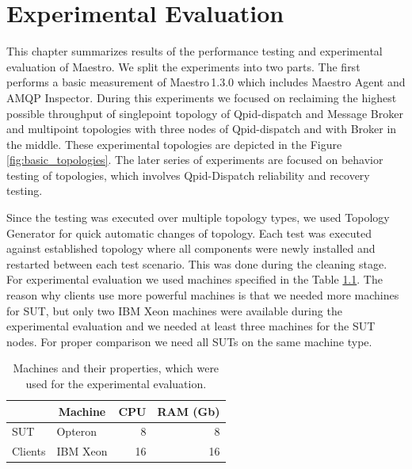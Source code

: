 
\chapter{Experimental Evaluation}
\label{Experimental Evaluation}
This chapter summarizes results of the performance testing and experimental evaluation of Maestro. We split the experiments into two parts. The first performs a basic measurement of Maestro\,1.3.0 which includes Maestro Agent and AMQP Inspector. During this experiments we focused on reclaiming the highest possible throughput of singlepoint topology of Qpid-dispatch and Message Broker and multipoint topologies with three nodes of Qpid-dispatch and with Broker in the middle. These experimental topologies are depicted in the Figure \ref{fig:basic_topologies}. The later series of experiments are focused on behavior testing of topologies, which involves Qpid-Dispatch reliability and recovery testing.

Since the testing was executed over multiple topology types, we used Topology Generator for quick automatic changes of topology. Each test was executed against established topology where all components were newly installed and restarted between each test scenario. This was done during the cleaning stage. For experimental evaluation we used machines specified in the Table \ref{tab:machines}. The reason why clients use more powerful machines is that we needed more machines for SUT, but only two IBM Xeon machines were available during the experimental evaluation and we needed at least three machines for the SUT nodes. For proper comparison we need all SUTs on the same machine type.

\begin{table}[H]
\centering
\caption{Machines and their properties, which were used for the experimental evaluation.}
\label{tab:machines}
\begin{tabular}{|l|l|r|r|}
\hline
\rowcolor[HTML]{C5E3DF}
\textbf{} & \multicolumn{1}{c|}{\cellcolor[HTML]{C5E3DF}\textbf{Machine}} & \multicolumn{1}{c|}{\cellcolor[HTML]{C5E3DF}\textbf{CPU}} & \multicolumn{1}{c|}{\cellcolor[HTML]{C5E3DF}\textbf{RAM (Gb)}} \\ \hline
SUT & Opteron & 8 & 8 \\ \hline
Clients & IBM Xeon & 16 & 16 \\ \hline
\end{tabular}
\end{table}

